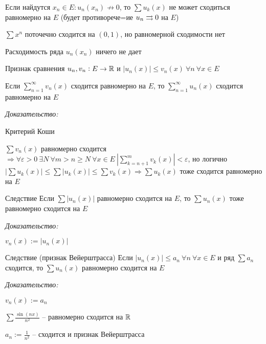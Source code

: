 \documentclass[12pt]{article}
\begin{document}
\begin{Remark}{}
    Если найдутся $x_n \in E : u_n(x_n) \not\to 0$, то $\sum u_k(x)$ не может сходиться равномерно на $E$ (будет противорече=ие $u_n \rightrightarrows 0$ на $E$)
\end{Remark}

\begin{Example}{}
    $\sum\limits x^n$ поточечно сходится на $(0, 1)$, но равномерной сходимости нет
\end{Example}

\begin{Remark}{}
    Расходимость ряда $u_n(x_n)$ ничего не дает 
\end{Remark}

\begin{theo}{Признак сравнения}
    $u_n, v_n : E \to \mathbb R$ и $|u_n(x)| \leq v_n(x)\ \forall n\ \forall x \in E$

    Если $\sum\limits_{n = 1}^\infty v_n(x)$ сходится равномерно на $E$, то $\sum\limits_{n = 1}^\infty u_n(x)$ сходится равномерно на $E$
\end{theo}

\textit{Доказательство:}

Критерий Коши

$\sum v_n(x)$ равномерно сходится $\Rightarrow \forall \varepsilon > 0\ \exists N\ \forall m > n \geq N\ \forall x \in E\ |\sum\limits_{k = n + 1}^m v_k(x)| < \varepsilon$, но логично $|\sum u_k(x)| \leq \sum |u_k(x)| \leq \sum v_k(x) \Rightarrow \sum u_k(x)$ тоже сходится равномерно на $E$

\begin{theo}{Следствие}
    Если $\sum |u_n(x)|$ равномерно сходится на $E$, то $\sum u_n(x)$ тоже равномерно сходится на $E$
\end{theo}

\textit{Доказательство:}

$v_n(x) := |u_n(x)|$ 

\begin{theo}{Следствие (признак Вейерштрасса)}
    Если $|u_n(x)| \leq a_n\ \forall n\ \forall x \in E$ и ряд $\sum a_n$ сходится, то $\sum u_n(x)$ равномерно сходится на $E$
\end{theo}

\textit{Доказательство:}

$v_n(x) := a_n$

\begin{Example}{}
    $\sum \frac{\sin(nx)}{n^2}$ -- равномерно сходится на $\mathbb R$

    $a_n := \frac{1}{n^2}$ -- сходится и признак Вейерштрасса
\end{Example}
\end{document}
